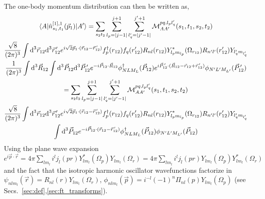 \documentclass[10pt]{article}
\begin{document}
The one-body momentum distribution can then be written as,
\begin{multline}
	\braket{ A | \hat{n}_{s_1,t_1}^{[1],1}(\vec{p}_1) | A'} = \sum_{s_2 
t_2}  \sum_{l_p = |j-1|}^{j+1} \sum_{l_q' = |j' - 1|}^{j'+1} 
\mathcal{M}_{AA'}^{p q,l_p l_q'}(s_1,t_1,s_2,t_2) \\
   \frac{\sqrt{8}}{(2 \pi)^{3}} \int \text{d}^{3} \vec{r}_{12} \text{d}^{3} 
\vec{r}_{12}^{\, \prime}  e^{ i \sqrt{2} \vec{p}_{1} \cdot ( \vec{r}_{12} - 
\vec{r}_{12}^{\, \prime}) }  f_{p}^{\dagger}(r_{12}) f_{q}(r_{12}')
R_{nl}(r_{12})Y_{l_pm_{l_p}}^*(\Omega_{r_{12}}) 
R_{n'l'}(r'_{12})Y_{l'_qm_{l'_q}}
 \\
   \frac{1}{(2 \pi)^{3}} \int  \text{d}^{3} \vec{R}_{12} \int \text{d}^{3} 
\vec{P}_{12} \text{d}^{3} \vec{P}_{12}^{\, \prime} e^{ -i \vec{P}_{12} 
\cdot \vec{R}_{12}} \phi_{N L M_L}^{\dagger}(\vec{P}_{12}) e^{ i 
\vec{P}_{12}^{\, \prime} \cdot ( \vec{R}_{12} - \vec{r}_{12} + \vec{r}_{12}^{\, 
\prime})} \phi_{N' L' M_{L'}}(\vec{P}_{12}^{\, \prime}) \\
  = \sum_{s_2 t_2}  \sum_{l_p = |j-1|}^{j+1} \sum_{l_q' = |j' - 1|}^{j'+1} 
\mathcal{M}_{AA'}^{p q,l_p l_q'}(s_1,t_1,s_2,t_2) \\
    \frac{\sqrt{8}}{(2 \pi)^{3}} \int \text{d}^{3} \vec{r}_{12} \text{d}^{3} 
\vec{r}_{12}^{\, \prime}  e^{ i \sqrt{2} \vec{p}_{1} \cdot ( \vec{r}_{12} - 
\vec{r}_{12}^{\, \prime}) } f_{p}^{\dagger}(r_{12}) f_{q}(r_{12}') 
R_{nl}(r_{12})Y_{l_pm_{l_p}}^*(\Omega_{r_{12}}) 
R_{n'l'}(r'_{12})Y_{l'_qm_{l'_q}} \\
   \int \text{d}^{3} \vec{P}_{12} e^{ -i \vec{P}_{12} \cdot (\vec{r}_{12} - 
\vec{r}_{12}^{\, \prime})} \phi_{N L M_L}^{\dagger}(\vec{P}_{12}) \phi_{N' L' 
M_{L'}}(\vec{P}_{12}) \label{eq:factorize}
\end{multline}
Using the plane wave expansion $e^{i \vec{p} \cdot \vec{r}} = 4 \pi \sum_{l 
m_l} i^{l} j_{l}(p r) Y_{l m_l}^{*}(\Omega_{p}) Y_{l m_l}(\Omega_{r}) = 4 \pi 
\sum_{l m_l} i^{l} j_{l}(p r) Y_{l m_l}(\Omega_{p}) Y_{l m_l}^{*}(\Omega_{r})$ 
and the fact that the isotropic harmonic oscillator wavefunctions factorize in 
$\psi_{n l m_l}(\vec{r}) = R_{n l}(r) Y_{l m_l}(\Omega_{r})$, $\phi_{n l 
m_l}(\vec{p}) = i^{-l}(-1)^{n} \Pi_{n l}(p) Y_{l m_l}(\Omega_{p})$ (see 
Secs.~\ref{sec:def},\ref{sec:ft_transforms}).
\end{document}
